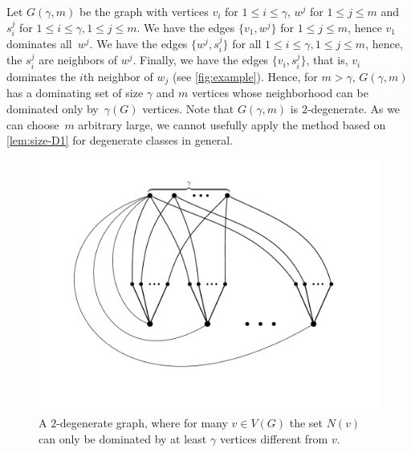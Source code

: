 \begin{example}
Let $G(\gamma,m)$ be the graph with vertices $v_i$ for $1\leq i\leq \gamma$,
$w^j$ for $1\leq j\leq m$ and $s_i^j$ for $1\leq i\leq \gamma, 1\leq j\leq m$.
We have the edges $\{v_1, w^j\}$ for $1\leq j\leq m$, hence $v_1$
dominates all~$w^j$. We have the edges $\{w^j, s_i^j\}$ for all $1\leq i\leq \gamma,
1\leq j\leq m$, hence, the $s_i^j$ are neighbors of $w^j$. Finally,
we have the edges $\{v_i, s_i^j\}$, that is, $v_i$ dominates the $i$th
neighbor of $w_j$ (see \cref{fig:example}). Hence, for $m>\gamma$,
$G(\gamma, m)$ has a dominating set of size
$\gamma$ and $m$ vertices whose neighborhood can be dominated
only by~$\gamma(G)$ vertices.
Note that $G(\gamma,m)$ is
\mbox{$2$-degenerate}. As we can choose~$m$ arbitrary
large, we cannot usefully apply the method based on
\cref{lem:size-D1} for degenerate classes in general.

\vspace{-3mm}
\begin{center}
  \begin{figure}[h]
    \center
    \includegraphics[scale=0.3]{ds1.png}

    \vspace{-3mm}
    \caption{ A $2$-degenerate graph, where for many $v\in V(G)$ the set $N(v)$ can only be dominated by at least $\gamma$ vertices different from $v$. }
  \end{figure}\label{fig:example}
\end{center}
\end{example}
